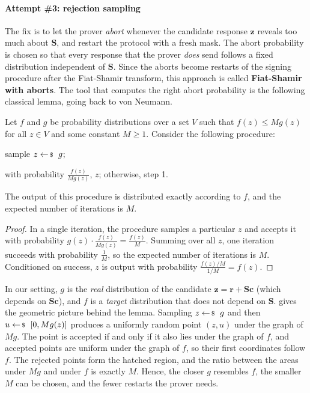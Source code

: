 \documentclass[../../book.tex]{subfiles}
\begin{document}
\paragraph{Attempt \#3: rejection sampling}
The fix is to let the prover \emph{abort} whenever the candidate response $\mathbf{z}$ reveals too much about $\mathbf{S}$, and restart the protocol with a fresh mask.
The abort probability is chosen so that every response that the prover \emph{does} send follows a fixed distribution independent of $\mathbf{S}$.
Since the aborts become restarts of the signing procedure after the Fiat-Shamir transform, this approach is called \textbf{Fiat-Shamir with aborts}.
The tool that computes the right abort probability is the following classical lemma, going back to von Neumann.

\begin{lemma}\label{lemma:rejection-sampling}
    Let $f$ and $g$ be probability distributions over a set $V$ such that $f(z) \leq M g(z)$ for all $z \in V$ and some constant $M \geq 1$.
    Consider the following procedure:
    \begin{algoen}
        \item sample $z \leftarrowS g$;
        \item with probability $\frac{f(z)}{Mg(z)}$,  $z$; otherwise,  step 1.
    \end{algoen}
    The output of this procedure is distributed exactly according to $f$, and the expected number of iterations is $M$.
\end{lemma}

\begin{proof}
    In a single iteration, the procedure samples a particular $z$ and accepts it with probability $g(z) \cdot \frac{f(z)}{Mg(z)} = \frac{f(z)}{M}$.
    Summing over all $z$, one iteration succeeds with probability $\frac{1}{M}$, so the expected number of iterations is $M$.
    Conditioned on success, $z$ is output with probability $\frac{f(z)/M}{1/M} = f(z)$.
\end{proof}

In our setting, $g$ is the \emph{real} distribution of the candidate $\mathbf{z} = \mathbf{r} + \mathbf{S}\mathbf{c}$ (which depends on $\mathbf{S}\mathbf{c}$), and $f$ is a \emph{target} distribution that does not depend on $\mathbf{S}$.
 gives the geometric picture behind the lemma.
Sampling $z \leftarrowS g$ and then $u \leftarrowS [0, Mg(z)]$ produces a uniformly random point $(z,u)$ under the graph of $Mg$.
The point is accepted if and only if it also lies under the graph of $f$, and accepted points are uniform under the graph of $f$, so their first coordinates follow $f$.
The rejected points form the hatched region, and the ratio between the areas under $Mg$ and under $f$ is exactly $M$.
Hence, the closer $g$ resembles $f$, the smaller $M$ can be chosen, and the fewer restarts the prover needs.
\end{document}
